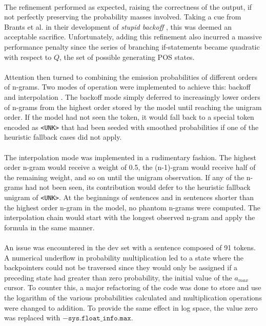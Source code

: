 \documentclass[11pt,a4paper]{article}
\begin{document}
\paragraph{}
The refinement performed as expected, raising the correctness of the output, if not
perfectly preserving the probability masses involved. Taking a cue from Brants et al.
in their development of \emph{stupid backoff} , this was deemed
an acceptable sacrifice. Unfortunately, adding this refinement also incurred a massive
performance penalty since the series of branching if-statements became quadratic with
respect to $Q$, the set of possible generating POS states.

\paragraph{}
Attention then turned to combining the emission probabilities of different orders of n-grams.
Two modes of operation were implemented to achieve this: backoff and interpolation \cite[49-50]{JurafskyMartin}.
The backoff mode simply deferred to increasingly lower orders of n-grams from the
highest order stored by the model until reaching the unigram order.
If the model had not seen the token, it would fall back to a special token
encoded as \texttt{<UNK>} that had been seeded with smoothed probabilities if one
of the heuristic fallback cases did not apply.

\paragraph{}
The interpolation mode was implemented in a rudimentary fashion. The highest order n-gram
would receive a weight of 0.5, the (n-1)-gram would receive half of the remaining weight,
and so on until the unigram observation. If any of the n-grams had not been seen, its
contribution would defer to the heuristic fallback unigram of \texttt{<UNK>}.
At the beginnings of sentences and in sentences shorter than the highest order n-gram
in the model, no phantom n-grams were computed. The interpolation chain would start with
the longest observed n-gram and apply the formula in the same manner.

\paragraph{}
An issue was encountered in the dev set with a sentence composed of 91 tokens. A numerical
underflow in probability multiplication led to a state where the backpointers could not be
traversed since they would only be assigned if a preceding state had greater than zero
probability, the initial value of the $a_{max}$ cursor. To counter this, a major refactoring
of the code was done to store and use the logarithm of the various probabilities calculated
and multiplication operations were changed to addition. To provide the same effect in log
space, the value zero was replaced with $-\texttt{sys.float\_info.max}$.
\end{document}
